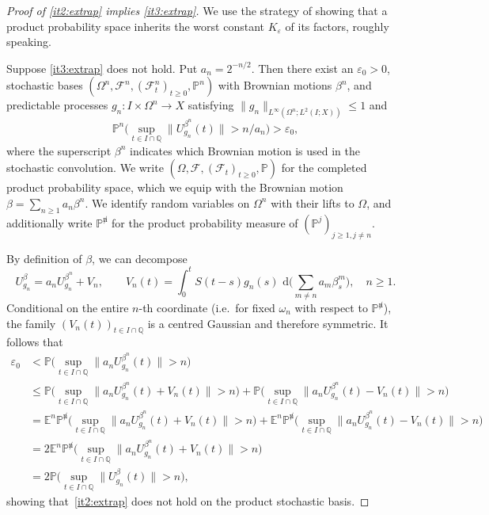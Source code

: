 \documentclass[11pt]{amsart}
\theoremstyle{definition}
\theoremstyle{remark}
\numberwithin{equation}{section}
\newcommand{\E}{\mathbb E}
\newcommand{\F}{\mathscr F}
\renewcommand{\P}{\mathbb P}
\newcommand{\Q}{\mathbb Q}
\newcommand{\1}{\mathbf 1}
\newcommand{\norm}[1]{\lVert #1\rVert}
\newcommand{\dd}{\,\mathrm d}
\begin{document}
\begin{proof}[Proof of \ref{it2:extrap} implies \ref{it3:extrap}]
We use the strategy of showing that a product probability space inherits the worst constant $K_{\varepsilon}$ of its factors, roughly speaking.

Suppose \ref{it3:extrap} does not hold. Put $a_n=2^{-n/2}$.
Then there exist an $\varepsilon_0>0$, stochastic bases $(\Omega^n, \F^n,(\F_t^n)_{t\geq 0}, \P^n)$  with Brownian motions
$\beta^n$, and predictable processes $g_n:I\times \Omega^n\to X$ satisfying
$\norm{g_n}_{L^\infty(\Omega^n;L^2(I;X))}\le 1$ and
\[
 \P^n\Big(\sup_{t\in I\cap\Q}\norm{U^{\beta^n}_{g_n}(t)}
       >n/a_n\Big)>\varepsilon_0,
\]
where the superscript $\beta^n$ indicates which Brownian motion is used in the stochastic convolution.
We write $(\Omega, \F,(\F_t)_{t\geq 0}, \P)$ for the completed product probability space, which we equip with the Brownian motion $\beta=\sum_{n\ge1}a_n\beta^n$.
We identify random variables on $\Omega^n$ with their lifts to $\Omega$, and additionally write $\P^{\not n}$ for the product probability measure of $(\P^j)_{j\geq 1,j \neq n}$.

By definition of $\beta$, we can decompose
\[
 U^\beta_{g_n}=a_nU^{\beta^n}_{g_n}+V_n,
 \qquad
 V_n(t)=\int_0^t S(t-s)g_n(s)\,
       \dd\Big(\sum_{m\ne n}a_m\beta^m_s\Big), \quad n \geq 1.
\]
Conditional on the entire $n$-th coordinate (i.e.\ for fixed $\omega_n$ with respect to $\P^{\not n}$), the family $(V_n(t))_{t\in I\cap\Q}$
 is a centred Gaussian and therefore symmetric. It follows that 
\begin{align*}
    \varepsilon_0 &<\P\Big(\sup_{t\in I\cap\Q}\norm{a_n U^{\beta^n}_{g_n}(t)}>n\Big) \\ 
    & \leq \P\Big(\sup_{t\in I\cap\Q}\norm{a_n U^{\beta^n}_{g_n}(t) + V_n(t)}>n\Big) + \P\Big(\sup_{t\in I\cap\Q}\norm{a_n U^{\beta^n}_{g_n}(t) - V_n(t)}>n\Big)
\\ 
    & = \E^n \P^{\not n}\Big(\sup_{t\in I\cap\Q}\norm{a_n U^{\beta^n}_{g_n}(t) + V_n(t)}>n\Big) + \E^n \P^{\not n}\Big(\sup_{t\in I\cap\Q}\norm{a_n U^{\beta^n}_{g_n}(t) - V_n(t)}>n\Big)  \\
    & = 2 \E^n \P^{\not n}\Big(\sup_{t\in I\cap\Q}\norm{a_n U^{\beta^n}_{g_n}(t) + V_n(t)}>n\Big)  
    \\ & = 2 \P\Big(\sup_{t\in I\cap\Q}\norm{U^\beta_{g_n}(t)}>n\Big),
\end{align*}
showing that~\ref{it2:extrap} does not hold on the product stochastic basis. 

\end{proof}
\end{document}
